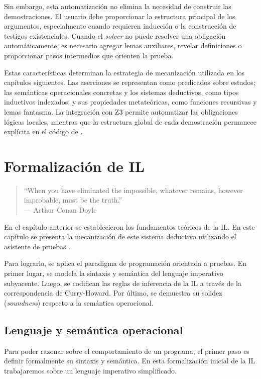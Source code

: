 \documentclass[a4paper,	11pt]{report}
\begin{document}
Sin embargo, esta automatización no elimina la necesidad de construir las demostraciones.
El usuario debe proporcionar la estructura principal de los argumentos,
especialmente cuando requieren inducción o la construcción de testigos existenciales.
Cuando el \emph{solver} no puede resolver una obligación automáticamente,
es necesario agregar lemas auxiliares,
revelar definiciones o proporcionar pasos intermedios que orienten la prueba.

Estas características determinan la estrategia de mecanización utilizada en los capítulos siguientes.
Las aserciones se representan como predicados sobre estados;
las semánticas operacionales concretas y los sistemas deductivos,
como tipos inductivos indexados;
y sus propiedades metateóricas, como funciones recursivas y lemas fantasma.
La integración con Z3 permite automatizar las obligaciones lógicas locales,
mientras que la estructura global de cada demostración permanece explícita en el código de \fstar{}.


\chapter{Formalización de IL}
\label{cap:formalizacion-il}
\begin{quote}
``When you have eliminated the impossible, whatever remains, however improbable, must be the truth.'' \\
\raggedleft --- Arthur Conan Doyle
\end{quote}

En el capítulo anterior se establecieron los fundamentos teóricos de la IL.
En este capítulo se presenta la mecanización de este sistema deductivo utilizando el asistente de pruebas \fstar{}.

Para lograrlo, se aplica el paradigma de programación orientada a pruebas.
En primer lugar, se modela la sintaxis y semántica del lenguaje imperativo subyacente.
Luego, se codifican las reglas de inferencia de la IL a través de la correspondencia de Curry-Howard.
Por último, se demuestra su solidez (\emph{soundness}) respecto a la semántica operacional.

\section{Lenguaje y semántica operacional}
\label{sec:il-sintaxis}
Para poder razonar sobre el comportamiento de un programa,
el primer paso es definir formalmente su sintaxis y semántica.
En esta formalización inicial de la IL trabajaremos sobre un lenguaje imperativo simplificado.
\end{document}
